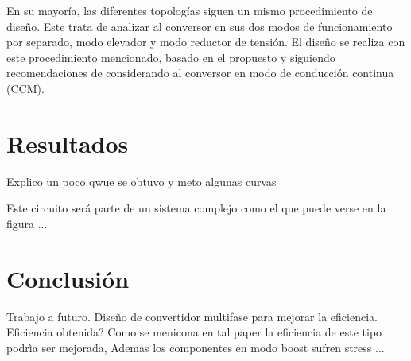        
    En su mayoría, las diferentes topologías siguen un mismo procedimiento de diseño. Este trata de analizar al  conversor en sus dos modos de funcionamiento por separado, modo elevador y modo reductor de tensión. El diseño se realiza con este procedimiento mencionado, basado en el propuesto \cite{espinosa2017asynchronous} y siguiendo recomendaciones de \cite{haifengdesign} considerando al conversor en modo de conducción continua (CCM). 
       
      
  
    
    

\section{Resultados}
 
    Explico un poco qwue se obtuvo y meto algunas curvas 
    
    Este circuito será parte de un sistema complejo como el que puede verse en la figura ... 
 
\section{Conclusión}

Trabajo a futuro. Diseño de convertidor multifase para mejorar la eficiencia. 
Eficiencia obtenida? 
Como se menicona en tal paper la eficiencia de este tipo podrìa ser mejorada, Ademas los componentes en modo boost sufren stress ... 




\nocite{*}





